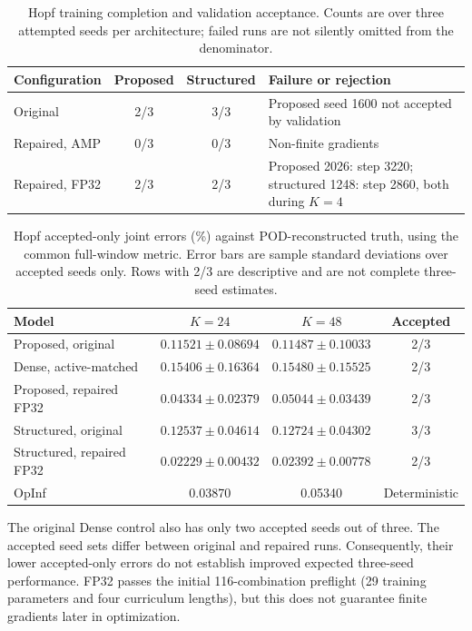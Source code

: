 \documentclass{article}
\begin{document}
\begin{table}[H]
\centering
\caption{Hopf training completion and validation acceptance.
Counts are over three attempted seeds per architecture; failed runs
are not silently omitted from the denominator.}
\label{tab:hopf_completion}
\small
\begin{tabular}{@{}lccp{5.8cm}@{}}
\toprule
Configuration & Proposed & Structured & Failure or rejection\\
\midrule
Original & 2/3 & 3/3 & Proposed seed 1600 not accepted by validation\\
Repaired, AMP & 0/3 & 0/3 & Non-finite gradients\\
Repaired, FP32 & 2/3 & 2/3 & Proposed 2026: step 3220; structured 1248:
step 2860, both during $K=4$\\
\bottomrule
\end{tabular}
\end{table}

\begin{table}[H]
\centering
\caption{Hopf accepted-only joint errors (\%) against POD-reconstructed
truth, using the common full-window metric. Error bars are sample
standard deviations over accepted seeds only. Rows with 2/3 are
descriptive and are not complete three-seed estimates.}
\label{tab:hopf_accepted}
\small
\begin{tabular}{@{}lccc@{}}
\toprule
Model & $K=24$ & $K=48$ & Accepted\\
\midrule
Proposed, original & $0.11521\pm0.08694$ & $0.11487\pm0.10033$ & 2/3\\
Dense, active-matched & $0.15406\pm0.16364$ & $0.15480\pm0.15525$ & 2/3\\
Proposed, repaired FP32 & $0.04334\pm0.02379$ & $0.05044\pm0.03439$ & 2/3\\
Structured, original & $0.12537\pm0.04614$ & $0.12724\pm0.04302$ & 3/3\\
Structured, repaired FP32 & $0.02229\pm0.00432$ & $0.02392\pm0.00778$ & 2/3\\
OpInf & 0.03870 & 0.05340 & Deterministic\\
\bottomrule
\end{tabular}
\end{table}

The original Dense control also has only two accepted seeds out of three.
The accepted seed sets differ between original and repaired runs.
Consequently, their lower accepted-only errors do not establish improved
expected three-seed performance. FP32 passes the initial 116-combination
preflight (29 training parameters and four curriculum lengths), but this
does not guarantee finite gradients later in optimization.
\end{document}
